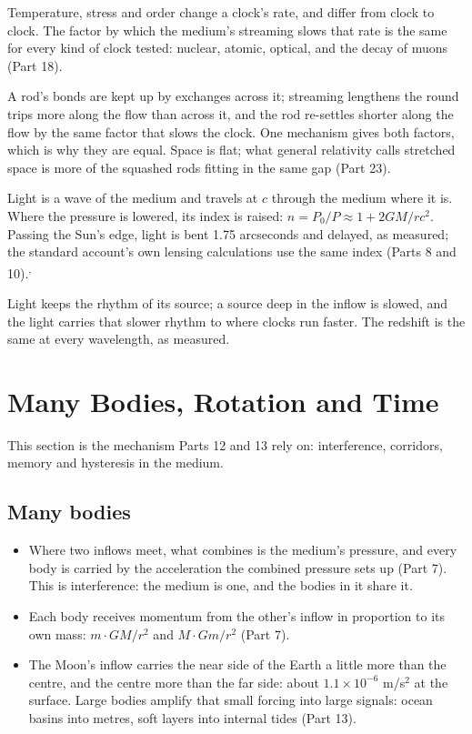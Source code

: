 \documentclass[11pt,a4paper]{article}
\begin{document}
 Temperature, stress and order change a clock's rate, and differ from clock to clock. The factor by which the medium's streaming slows that rate is the same for every kind of clock tested: nuclear, atomic, optical, and the decay of muons (Part 18).

 A rod's bonds are kept up by exchanges across it; streaming lengthens the round trips more along the flow than across it, and the rod re-settles shorter along the flow by the same factor that slows the clock. One mechanism gives both factors, which is why they are equal. Space is flat; what general relativity calls stretched space is more of the squashed rods fitting in the same gap (Part 23).

 Light is a wave of the medium and travels at $c$ through the medium where it is. Where the pressure is lowered, its index is raised: $n = P_0/P \approx 1 + 2GM/rc^2$. Passing the Sun's edge, light is bent 1.75 arcseconds and delayed, as measured; the standard account's own lensing calculations use the same index (Parts 8 and 10).\textsuperscript{,}

 Light keeps the rhythm of its source; a source deep in the inflow is slowed, and the light carries that slower rhythm to where clocks run faster. The redshift is the same at every wavelength, as measured.

\section{Many Bodies, Rotation and Time}

This section is the mechanism Parts 12 and 13 rely on: interference, corridors, memory and hysteresis in the medium.

\subsection{Many bodies}

\begin{itemize}
\item {} Where two inflows meet, what combines is the medium's pressure, and every body is carried by the acceleration the combined pressure sets up (Part 7). This is interference: the medium is one, and the bodies in it share it.
\item {} Each body receives momentum from the other's inflow in proportion to its own mass: $m \cdot GM/r^2$ and $M \cdot Gm/r^2$ (Part 7).
\item {} The Moon's inflow carries the near side of the Earth a little more than the centre, and the centre more than the far side: about $1.1\times10^{-6}$ m/s$^2$ at the surface. Large bodies amplify that small forcing into large signals: ocean basins into metres, soft layers into internal tides (Part 13).
\end{itemize}
\end{document}
